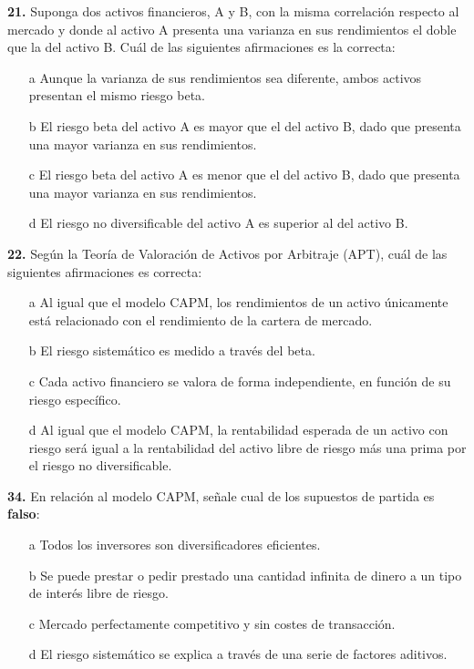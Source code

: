 \documentclass{nuevotema}
\begin{document}
\textbf{21.} Suponga dos activos financieros, A y B, con la misma correlación respecto al mercado y donde al activo A presenta una varianza en sus rendimientos el doble que la del activo B. Cuál de las siguientes afirmaciones es la correcta:
\begin{enumerate}
	\item[a] Aunque la varianza de sus rendimientos sea diferente, ambos activos presentan el mismo riesgo beta.
	\item[b] El riesgo beta del activo A es mayor que el del activo B, dado que presenta una mayor varianza en sus rendimientos.
	\item[c] El riesgo beta del activo A es menor que el del activo B, dado que presenta una mayor varianza en sus rendimientos. 
	\item[d] El riesgo no diversificable del activo A es superior al del activo B.
\end{enumerate}

\textbf{22.} Según la Teoría de Valoración de Activos por Arbitraje (APT), cuál de las siguientes afirmaciones es correcta:
\begin{enumerate}
	\item[a] Al igual que el modelo CAPM, los rendimientos de un activo únicamente está relacionado con el rendimiento de la cartera de mercado.
	\item[b] El riesgo sistemático es medido a través del beta.
	\item[c] Cada activo financiero se valora de forma independiente, en función de su riesgo específico.
	\item[d] Al igual que el modelo CAPM, la rentabilidad esperada de un activo con riesgo será igual a la rentabilidad del activo libre de riesgo más una prima por el riesgo no diversificable. 
\end{enumerate}

\textbf{34.} En relación al modelo CAPM, señale cual de los supuestos de partida es \textbf{falso}:
\begin{enumerate}
	\item[a] Todos los inversores son diversificadores eficientes.
	\item[b] Se puede prestar o pedir prestado una cantidad infinita de dinero a un tipo de interés libre de riesgo.
	\item[c] Mercado perfectamente competitivo y sin costes de transacción.
	\item[d] El riesgo sistemático se explica a través de una serie de factores aditivos.
\end{enumerate}
\end{document}

